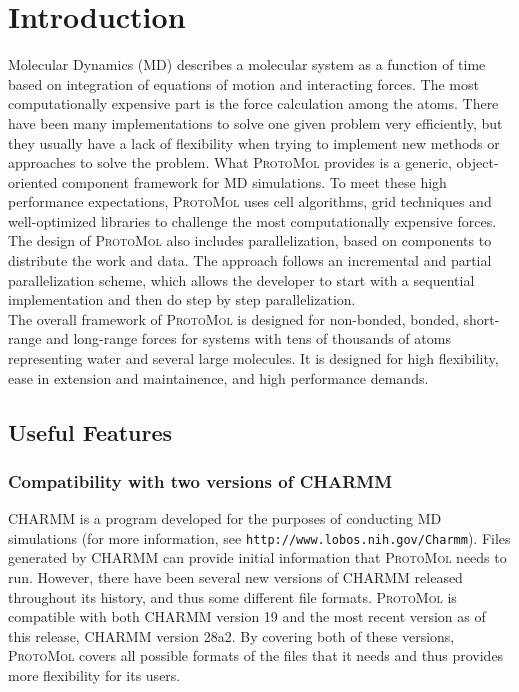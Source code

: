 \documentclass[11pt]{report}
\newcommand{\ProtoMol}{\textsc{ProtoMol }}
\providecommand{\ttsmall}[1]{\texttt{\small\mbox{#1}}}
\begin{document}
\chapter{Introduction}

Molecular Dynamics (MD) describes a molecular system as a function of
time based on integration of equations of motion and interacting
forces.  The most computationally expensive part is the force
calculation among the atoms.  There have been many implementations to
solve one given problem very efficiently, but they usually have a lack
of flexibility when trying to implement new methods or approaches to
solve the problem.  What \ProtoMol provides is a generic,
object-oriented component framework for MD simulations.  To meet these
high performance expectations, \ProtoMol uses cell algorithms, grid
techniques and well-optimized libraries to challenge the most
computationally expensive forces.  The design of \ProtoMol also
includes parallelization, based on components to distribute the work
and data.  The approach follows an incremental and partial
parallelization scheme, which allows the developer to start with a
sequential implementation and then do step by step parallelization. \\


The overall framework of \ProtoMol is designed for non-bonded, bonded,
short-range and long-range forces for systems with tens of thousands
of atoms representing water and several large molecules.  It is
designed for high flexibility, ease in extension and maintainence, and
high performance demands.

\section{Useful Features}

\subsection{Compatibility with two versions of CHARMM}

CHARMM is a program developed for the purposes of conducting MD
simulations (for more information, see \ttsmall
{http://www.lobos.nih.gov/Charmm}).  Files generated by CHARMM can
provide initial information that \ProtoMol needs to run.  However,
there have been several new versions of CHARMM released throughout its
history, and thus some different file formats.  \ProtoMol is
compatible with both CHARMM version 19 and the most recent version as
of this release, CHARMM version 28a2.  By covering both of these
versions, \ProtoMol covers all possible formats of the files that it
needs and thus provides more flexibility for its users.
\end{document}
